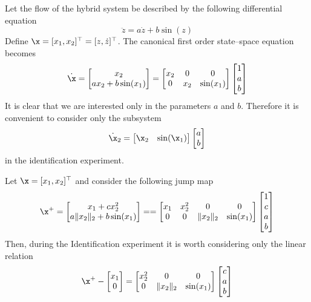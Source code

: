 \begin{exmp}\label{ex:ex2}
	Let the flow of the hybrid system be described by the following differential equation
	\begin{equation}
	    \ddot{z}=a\dot{z}+b\sin(z)
	\end{equation}
	Define $\x = [x_1,x_2]^\top=[z,\dot{z}]^\top$. The canonical first order state--space equation becomes
	\[\dot{\x}=\begin{bmatrix}x_2\\ax_2+b\sin(x_1)\end{bmatrix}=\begin{bmatrix}x_2&0&0\\0&x_2&\sin(x_1)\end{bmatrix}\begin{bmatrix}1\\a\\b\end{bmatrix}\]
	It is clear that we are interested only in the parameters $a$ and $b$. Therefore it is convenient to consider only the subsystem
	\[\dot{\x}_2=\begin{bmatrix}\x_2&\sin(\x_1)\end{bmatrix}\begin{bmatrix}a\\b\end{bmatrix}\] 
	in the identification experiment.
\end{exmp}
\begin{exmp}\label{ex:ex3}
	Let $\x=[x_1,x_2]^\top$ and consider the following jump map
	\begin{align}
	    {\x}^+=\begin{bmatrix}x_1+cx_2^2\\a\|x_2\|_2+b\sin(x_1)\end{bmatrix}=
	    =\begin{bmatrix}x_1&x_2^2&0&0\\0&0&\|x_2\|_2&\sin(x_1)\end{bmatrix}\begin{bmatrix}1\\c\\a\\b\end{bmatrix}
	\end{align}
	Then, during the Identification experiment it is worth considering only the linear relation
	\begin{equation}
	    {\x}^+-\begin{bmatrix}x_1\\0\end{bmatrix}=\begin{bmatrix}x_2^2&0&0\\0&\|x_2\|_2&\sin(x_1)\end{bmatrix}\begin{bmatrix}c\\a\\b\end{bmatrix}
	\end{equation}
\end{exmp}
%

